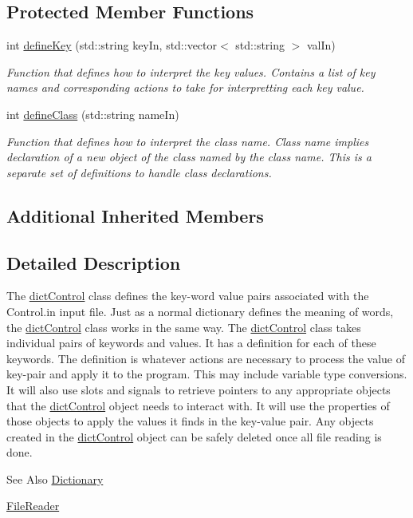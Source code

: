 \subsection*{Protected Member Functions}
\begin{DoxyCompactItemize}
\item 
int \hyperlink{classosea_1_1ofreq_1_1dict_control_a048421f7c1bc9b8a023a159c59407bb9}{define\-Key} (std\-::string key\-In, std\-::vector$<$ std\-::string $>$ val\-In)
\begin{DoxyCompactList}\small\item\em Function that defines how to interpret the key values. Contains a list of key names and corresponding actions to take for interpretting each key value. \end{DoxyCompactList}\item 
int \hyperlink{classosea_1_1ofreq_1_1dict_control_a8c9cbaf3a2d4601dca4ad74667594a9e}{define\-Class} (std\-::string name\-In)
\begin{DoxyCompactList}\small\item\em Function that defines how to interpret the class name. Class name implies declaration of a new object of the class named by the class name. This is a separate set of definitions to handle class declarations. \end{DoxyCompactList}\end{DoxyCompactItemize}
\subsection*{Additional Inherited Members}


\subsection{Detailed Description}
The \hyperlink{classosea_1_1ofreq_1_1dict_control}{dict\-Control} class defines the key-\/word value pairs associated with the Control.\-in input file. Just as a normal dictionary defines the meaning of words, the \hyperlink{classosea_1_1ofreq_1_1dict_control}{dict\-Control} class works in the same way. The \hyperlink{classosea_1_1ofreq_1_1dict_control}{dict\-Control} class takes individual pairs of keywords and values. It has a definition for each of these keywords. The definition is whatever actions are necessary to process the value of key-\/pair and apply it to the program. This may include variable type conversions. It will also use slots and signals to retrieve pointers to any appropriate objects that the \hyperlink{classosea_1_1ofreq_1_1dict_control}{dict\-Control} object needs to interact with. It will use the properties of those objects to apply the values it finds in the key-\/value pair. Any objects created in the \hyperlink{classosea_1_1ofreq_1_1dict_control}{dict\-Control} object can be safely deleted once all file reading is done. \begin{DoxySeeAlso}{See Also}
\hyperlink{classosea_1_1_dictionary}{Dictionary} 

\hyperlink{classosea_1_1_file_reader}{File\-Reader} 
\end{DoxySeeAlso}



